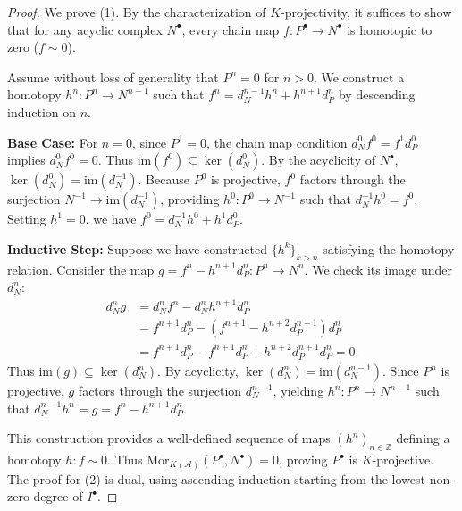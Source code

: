 \begin{proof}
    We prove (1). By the characterization of $K$-projectivity, it suffices to show that for any acyclic complex $N^\bullet$, every chain map $f: P^\bullet \to N^\bullet$ is homotopic to zero ($f \sim 0$).
    
    Assume without loss of generality that $P^n = 0$ for $n > 0$. We construct a homotopy $h^n: P^n \to N^{n-1}$ such that $f^n = d_N^{n-1}h^n + h^{n+1}d_P^n$ by descending induction on $n$.
    
    \textbf{Base Case:} For $n=0$, since $P^1=0$, the chain map condition $d_N^0 f^0 = f^1 d_P^0$ implies $d_N^0 f^0 = 0$. Thus $\text{im}(f^0) \subseteq \ker(d_N^0)$. By the acyclicity of $N^\bullet$, $\ker(d_N^0) = \text{im}(d_N^{-1})$. Because $P^0$ is projective, $f^0$ factors through the surjection $N^{-1} \to \text{im}(d_N^{-1})$, providing $h^0: P^0 \to N^{-1}$ such that $d_N^{-1}h^0 = f^0$. Setting $h^1 = 0$, we have $f^0 = d_N^{-1}h^0 + h^1 d_P^0$.
    
    \textbf{Inductive Step:} Suppose we have constructed $\{h^k\}_{k > n}$ satisfying the homotopy relation. Consider the map $g = f^n - h^{n+1}d_P^n: P^n \to N^n$. We check its image under $d_N^n$:
    \begin{align*}
        d_N^n g &= d_N^n f^n - d_N^n h^{n+1} d_P^n \\
        &= f^{n+1} d_P^n - (f^{n+1} - h^{n+2} d_P^{n+1}) d_P^n \\
        &= f^{n+1} d_P^n - f^{n+1} d_P^n + h^{n+2} d_P^{n+1} d_P^n = 0.
    \end{align*}
    Thus $\text{im}(g) \subseteq \ker(d_N^n)$. By acyclicity, $\ker(d_N^n) = \text{im}(d_N^{n-1})$. Since $P^n$ is projective, $g$ factors through the surjection $d_N^{n-1}$, yielding $h^n: P^n \to N^{n-1}$ such that $d_N^{n-1}h^n = g = f^n - h^{n+1}d_P^n$. 
    
    This construction provides a well-defined sequence of maps $(h^n)_{n \in \mathbb{Z}}$ defining a homotopy $h: f \sim 0$. Thus $\text{Mor}_{K(\mathcal{A})}(P^\bullet, N^\bullet) = 0$, proving $P^\bullet$ is $K$-projective. The proof for (2) is dual, using ascending induction starting from the lowest non-zero degree of $I^\bullet$.
\end{proof}
